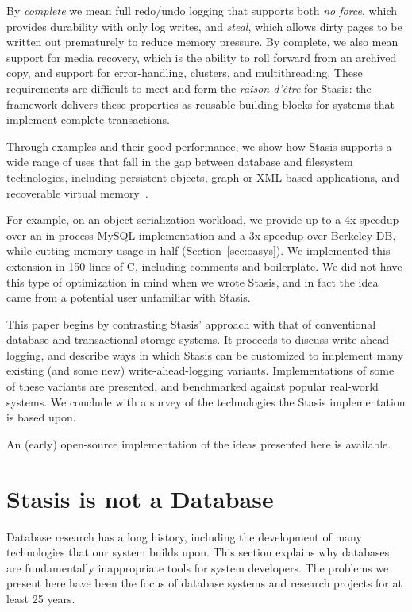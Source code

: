 \documentclass[letterpaper,twocolumn,10pt]{article}
\newcommand{\yad}{Stasis\xspace}
\newcommand{\yads}{Stasis'\xspace}
\begin{document}
By {\em complete} we mean full redo/undo logging that supports
both {\em no force}, which provides durability with only log writes,
and {\em steal}, which allows dirty pages to be written out prematurely
to reduce memory pressure. By complete, we also
mean support for media recovery, which is the ability to roll
forward from an archived copy, and support for error-handling,
clusters, and multithreading. These requirements are difficult
to meet and form the {\em raison d'\^etre} for \yad{}: the framework
delivers these properties as reusable building blocks for systems
that implement complete transactions.

Through examples and their good performance, we show how \yad{}
supports a wide range of uses that fall in the gap between 
database and filesystem technologies, including
persistent objects, graph or XML based applications, and recoverable
virtual memory~\cite{lrvm}.  

For example, on an object serialization workload, we provide up to 
a 4x speedup over an in-process MySQL implementation and a 3x speedup over Berkeley DB, while 
cutting memory usage in half (Section~\ref{sec:oasys}). 
We implemented this extension in 150 lines of C, including comments and boilerplate.  We did not have this type of optimization
in mind when we wrote \yad, and in fact the idea came from a potential 
user unfamiliar with \yad.


This paper begins by contrasting \yads approach with that of
conventional database and transactional storage systems.  It proceeds
to discuss write-ahead-logging, and describe ways in which \yad can be
customized to implement many existing (and some new) write-ahead-logging variants.  Implementations of some of these variants are
presented, and benchmarked against popular real-world systems.  We
conclude with a survey of the technologies the \yad implementation is
based upon.

An (early) open-source implementation of
the ideas presented here is available.

\section{\yad is not a Database}
\label{sec:notDB}
Database research has a long history, including the development of
many technologies that our system builds upon.  This section explains
why databases are fundamentally inappropriate tools for system
developers.  The problems we present here have been the focus of
database systems and research projects for at least 25 years.
\end{document}
